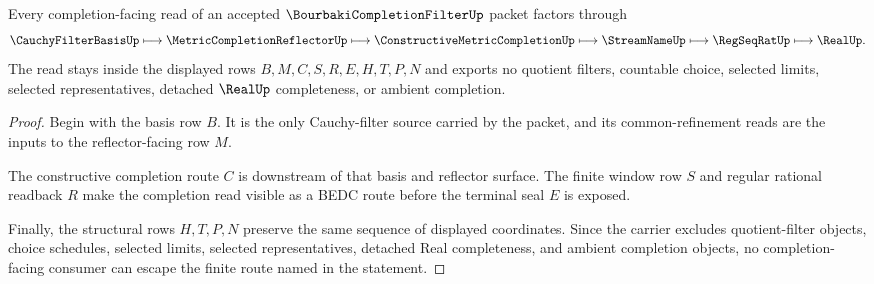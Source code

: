 \begin{theorem}
\label{thm:bourbaki-completion-filter-cauchy-nonescape}
Every completion-facing read of an accepted $\BourbakiCompletionFilterUp$ packet factors through
$$
\CauchyFilterBasisUp \longmapsto \MetricCompletionReflectorUp \longmapsto \ConstructiveMetricCompletionUp \longmapsto \StreamNameUp \longmapsto \RegSeqRatUp \longmapsto \RealUp .
$$
The read stays inside the displayed rows $B,M,C,S,R,E,H,T,P,N$ and exports no quotient filters, countable choice, selected limits, selected representatives, detached $\RealUp$ completeness, or ambient completion.
\end{theorem}
\begin{proof}
Begin with the basis row $B$. It is the only Cauchy-filter source carried by the packet, and its common-refinement reads are the inputs to the reflector-facing row $M$.

The constructive completion route $C$ is downstream of that basis and reflector surface. The finite window row $S$ and regular rational readback $R$ make the completion read visible as a BEDC route before the terminal seal $E$ is exposed.

Finally, the structural rows $H,T,P,N$ preserve the same sequence of displayed coordinates. Since the carrier excludes quotient-filter objects, choice schedules, selected limits, selected representatives, detached Real completeness, and ambient completion objects, no completion-facing consumer can escape the finite route named in the statement.
\end{proof}


\begin{closurestatus}{\BourbakiCompletionFilterUp}
  \theoryclosure{\seedClosure}
  \formalstatus{\unformalizedV}
\end{closurestatus}
